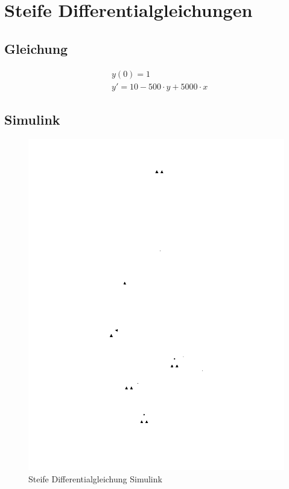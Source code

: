 \documentclass[10pt]{scrartcl}
\author{Oliver Steenbuck, Karolina Bernat}
\title{\titletext}
\date{31.10.2012}
\begin{document}
\maketitle
\setcounter{tocdepth}{3}
\tableofcontents
\listoffigures
\lstlistoflistings


\section{Steife Differentialgleichungen}
\subsection{Gleichung}
	\begin{align}
		&y(0)=1\\
		&y'=10-500 \cdot y + 5000 \cdot x
	\end{align}
	
	\subsection{Simulink}
		\begin{figure}[H]
			\centering	
			\includegraphics[width=\textwidth, angle=-90]{Prak1Aufg1Simulink.png}
            \caption{Steife Differentialgleichung Simulink}
            \label{pic:lorenzSimulink}
		\end{figure} 	
	
\end{document}

